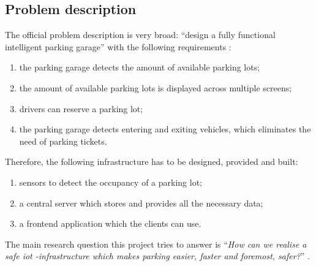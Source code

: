 
\subsection{Problem description}\label{sec:Problem description}
The official problem description is very broad: ``design a fully functional intelligent parking garage'' with the following requirements \cite{project_description}:
\begin{enumerate}
    \item the parking garage detects the amount of available parking lots;
    \item the amount of available parking lots is displayed across multiple screens;
    \item drivers can reserve a parking lot;
    \item the parking garage detects entering and exiting vehicles, which eliminates the need of parking tickets.
\end{enumerate}
Therefore, the following infrastructure has to be designed, provided and built:
\begin{enumerate}
    \item sensors to detect the occupancy of a parking lot;
    \item a central server which stores and provides all the necessary data;
    \item a frontend application which the clients can use.
\end{enumerate}
The main research question this project tries to answer is ``\textit{How can we realise a safe \ac{iot} -infrastructure which makes parking easier, faster and foremost, safer?}'' \cite{project_description}.